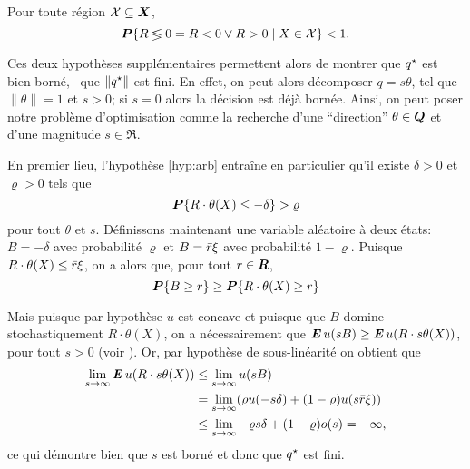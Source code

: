 \begin{assumption}
  \label{hyp:arb}
  Pour toute région $\mathcal{X}\subseteq\bm{X}$,
  \begin{equation}
    \bm P\{R \lessgtr 0 = R < 0 \vee R > 0 \mid X \in \mathcal{X}\} < 1.
  \end{equation}
\end{assumption}

Ces deux hypothèses supplémentaires permettent alors de montrer que $q^\star$ est bien borné,
\ie\ que $\|q^\star\|$ est fini. En effet, on peut alors décomposer $q = s\theta$, tel que
$\|\theta\|=1$ et $s>0$; si $s=0$ alors la décision est déjà bornée. Ainsi, on peut poser notre
problème d'optimisation comme la recherche d'une ``direction'' $\theta \in \bm Q$ et d'une magnitude
$s \in \Re$.

En premier lieu, l'hypothèse \ref{hyp:arb} entraîne en particulier qu'il existe
$\delta > 0$ et $\varrho > 0$ tels que
\begin{equation}
  \bm P\{R\cdot\theta(X) \leq -\delta\} > \varrho
\end{equation}
pour tout $\theta$ et $s$.  Définissons maintenant une variable aléatoire à
deux états: $B = -\delta$ avec probabilité $\varrho$ et $B = \bar r\xi$ avec probabilité
$1-\varrho$. Puisque $R\cdot \theta(X) \leq \bar r\xi$, on a alors que, pour tout $r \in \bm{R}$,
\begin{equation}
  \bm P\{B\geq r\} \geq \bm P\{R\cdot \theta(X)\geq r\}
\end{equation}

Mais puisque par hypothèse $u$ est concave et puisque que $B$ domine stochastiquement
$R\cdot \theta(X)$, on a nécessairement que $\operatorname{\mbox{\textbf{\textit{E}}}} u(sB) \geq \operatorname{\mbox{\textbf{\textit{E}}}} u(R\cdot s\theta(X))$, pour tout
$s > 0$ (voir \cite{eeckhoudt2005economic}). Or, par hypothèse de sous-linéarité on
obtient que
\begin{align}
  \lim_{s\to\infty}\operatorname{\mbox{\textbf{\textit{E}}}} u(R\cdot s\theta(X)) &\leq \lim_{s\to\infty}u(sB)\\
                           & = \lim_{s\to\infty}(\varrho u(-s\delta) + (1-\varrho)u(s\bar r\xi))\\
                           & \leq\lim_{s\to\infty}-\varrho s \delta + (1-\varrho)o(s) = -\infty,
\end{align}
ce qui démontre bien que $s$ est borné et donc que $q^\star$ est fini.

